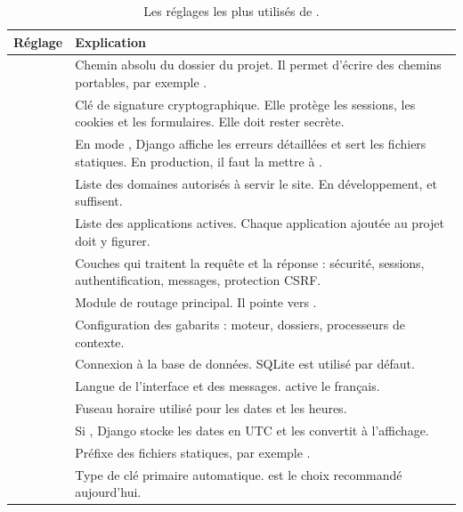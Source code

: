 \begin{table}[htbp]
\centering
\small
\begin{tabularx}{\textwidth}{L{4.2cm} X}
\toprule
\textbf{Réglage} & \textbf{Explication} \\
\midrule
{} & Chemin absolu du dossier du projet. Il permet d'écrire des
chemins portables, par exemple . \\
 & Clé de signature cryptographique. Elle protège les sessions,
les cookies et les formulaires. Elle doit rester secrète. \\
 & En mode , Django affiche les erreurs détaillées et sert
les fichiers statiques. En production, il faut la mettre à . \\
 & Liste des domaines autorisés à servir le site. En
développement,  et  suffisent. \\
 & Liste des applications actives. Chaque application ajoutée
au projet doit y figurer. \\
 & Couches qui traitent la requête et la réponse : sécurité,
sessions, authentification, messages, protection CSRF. \\
 & Module de routage principal. Il pointe vers
. \\
 & Configuration des gabarits : moteur, dossiers, processeurs de
contexte. \\
 & Connexion à la base de données. SQLite est utilisé par défaut. \\
 & Langue de l'interface et des messages.  active
le français. \\
 & Fuseau horaire utilisé pour les dates et les heures. \\
 & Si , Django stocke les dates en UTC et les convertit à
l'affichage. \\
 & Préfixe des fichiers statiques, par exemple
. \\
 & Type de clé primaire automatique. 
est le choix recommandé aujourd'hui. \\
\bottomrule
\end{tabularx}
\caption{Les réglages les plus utilisés de .}
\end{table}

